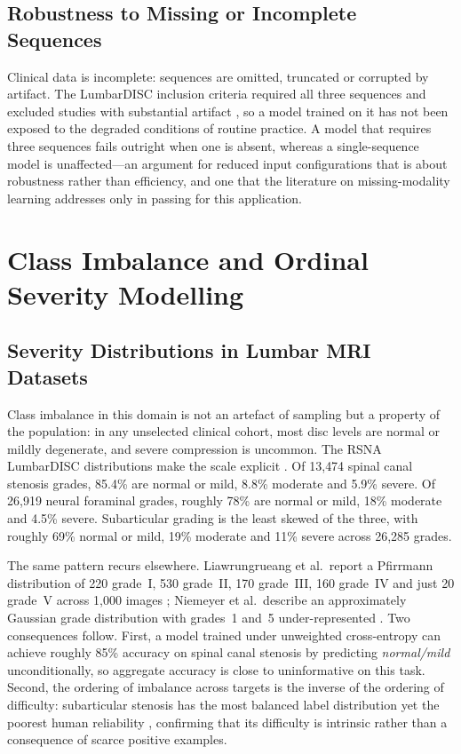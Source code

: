 \subsection{Robustness to Missing or Incomplete Sequences}
\label{sec:lr-missing}

Clinical data is incomplete: sequences are omitted, truncated or corrupted by
artifact. The LumbarDISC inclusion criteria required all three sequences and
excluded studies with substantial artifact \cite{richards2026the}, so a model
trained on it has not been exposed to the degraded conditions of routine
practice. A model that requires three sequences fails outright when one is
absent, whereas a single-sequence model is unaffected---an argument for reduced
input configurations that is about robustness rather than efficiency, and one
that the literature on missing-modality learning addresses only in passing for
this application.

\section{Class Imbalance and Ordinal Severity Modelling}
\label{sec:lr-imbalance}

\subsection{Severity Distributions in Lumbar MRI Datasets}
\label{sec:lr-distributions}

Class imbalance in this domain is not an artefact of sampling but a property of
the population: in any unselected clinical cohort, most disc levels are normal or
mildly degenerate, and severe compression is uncommon. The RSNA LumbarDISC
distributions make the scale explicit \cite{richards2026the}. Of 13{,}474 spinal
canal stenosis grades, 85.4\% are normal or mild, 8.8\% moderate and 5.9\%
severe. Of 26{,}919 neural foraminal grades, roughly 78\% are normal or mild,
18\% moderate and 4.5\% severe. Subarticular grading is the least skewed of the
three, with roughly 69\% normal or mild, 19\% moderate and 11\% severe across
26{,}285 grades.

The same pattern recurs elsewhere. Liawrungrueang et al.\ report a Pfirrmann
distribution of 220 grade~I, 530 grade~II, 170 grade~III, 160 grade~IV and just
20 grade~V across 1{,}000 images \cite{liawrungrueang2023automatic}; Niemeyer et
al.\ describe an approximately Gaussian grade distribution with grades~1 and~5
under-represented \cite{niemeyer2021a}. Two consequences follow. First, a model
trained under unweighted cross-entropy can achieve roughly 85\% accuracy on
spinal canal stenosis by predicting \emph{normal/mild} unconditionally, so
aggregate accuracy is close to uninformative on this task. Second, the ordering
of imbalance across targets is the inverse of the ordering of difficulty:
subarticular stenosis has the most balanced label distribution yet the poorest
human reliability \cite{lurie2008reliability}, confirming that its difficulty is
intrinsic rather than a consequence of scarce positive examples.

